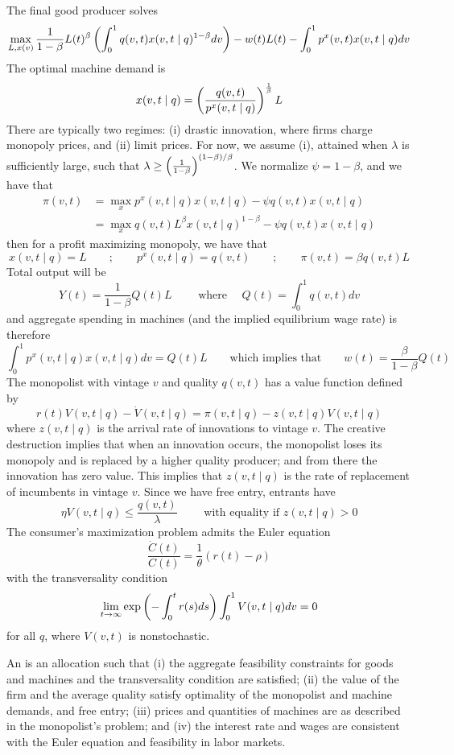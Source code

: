 \documentclass[10pt]{article}
\begin{document}
\begin{model}
	The final good producer solves \[\max_{L,x(v)} \frac{1}{1-\beta}L(t)^\beta \left( \int_0^1 q(v,t) x(v,t\mid q)^{1-\beta}dv\right) - w(t)L(t) - \int_0^1 p^x(v,t) x(v,t \mid q)dv \]The optimal machine demand is \[x(v,t \mid q) = \left( \frac{q(v,t)}{p^x(v,t\mid q)}\right)^{\frac{1}{\beta}} L\]There are typically two regimes: (i) drastic innovation, where firms charge monopoly prices, and (ii) limit prices. For now, we assume (i), attained when $\lambda$ is sufficiently large, such that $\lambda \ge \left( \frac{1}{1-\beta}\right)^{(1-\beta)/\beta}$. We normalize $\psi = 1-\beta$, and we have that 
	\begin{align*}
		\pi(v,t) &= \max_x p^x(v,t\mid q)x(v,t\mid q)-\psi q(v,t)x(v,t\mid q) \\ 
		&= \max_x q(v,t) L^\beta x(v,t \mid q)^{1-\beta} -\psi q(v,t)x(v,t\mid q)
	\end{align*}
	then for a profit maximizing monopoly, we have that \[x(v,t \mid q) = L \qquad ; \qquad p^x(v,t \mid q) = q(v,t) \qquad ; \qquad \pi(v,t) = \beta q(v,t)L\]Total output will be \[Y(t) = \frac{1}{1-\beta} Q(t) L \qquad \text{ where } \quad Q(t) = \int_0^1q(v,t)dv\]and aggregate spending in machines (and the implied equilibrium wage rate) is therefore\[\int_0^1 p^x(v,t\mid q)x(v,t \mid q)dv  = Q(t)L  \qquad \text{which implies that} \qquad w(t) = \frac{\beta}{1-\beta}Q(t)\]The monopolist with vintage $v$ and quality $q(v,t)$ has a value function defined by \[r(t)V(v,t\mid q) - \dot{V}(v,t\mid q) = \pi(v,t\mid q) - z(v,t \mid q) V(v,t\mid q)\]where $z(v,t\mid q)$ is the arrival rate of innovations to vintage $v$. The creative destruction implies that when an innovation occurs, the monopolist loses its monopoly and is replaced by a higher quality producer; and from there the innovation has zero value. This implies that $z(v,t\mid q)$ is the rate of replacement of incumbents in vintage $v$. Since we have free entry, entrants have \[\eta V(v,t \mid q) \le \frac{q(v,t)}{\lambda} \qquad \text{ with equality if } z(v,t \mid q) > 0\]The consumer's maximization problem admits the Euler equation \[\frac{\dot{C}(t)}{C(t)} = \frac{1}{\theta} (r(t) - \rho)\]with the transversality condition \[\lim_{t\to\infty} \exp \left( -\int_0^t r(s)ds\right) \int_0^1V(v,t\mid q)dv = 0\]for all $q$, where $V(v,t)$ is nonstochastic.
	
	\begin{definition}
		An  is an allocation such that (i) the aggregate feasibility constraints for goods and machines and the transversality condition are satisfied; (ii) the value of the firm and the average quality satisfy optimality of the monopolist and machine demands, and free entry; (iii) prices and quantities of machines are as described in the monopolist's problem; and (iv) the interest rate and wages are consistent with the Euler equation and feasibility in labor markets.
	\end{definition}
	

\end{model}
\end{document}
